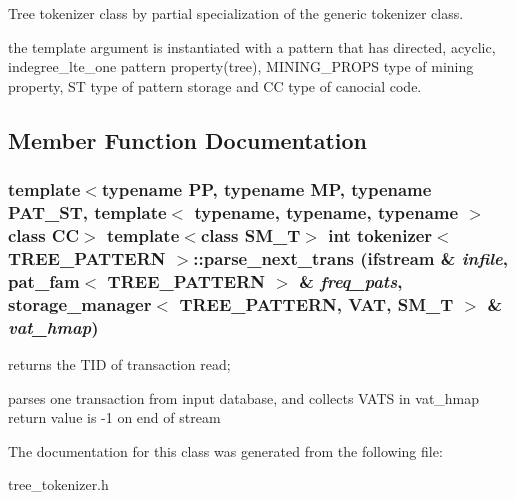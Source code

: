 Tree tokenizer class by partial specialization of the generic tokenizer class. 

the template argument is instantiated with a pattern that has directed, acyclic, indegree\_\-lte\_\-one pattern property(tree), MINING\_\-PROPS type of mining property, ST type of pattern storage and CC type of canocial code. 



\subsection{Member Function Documentation}
\subsubsection{\setlength{\rightskip}{0pt plus 5cm}template$<$typename PP, typename MP, typename PAT\_\-ST, template$<$ typename, typename, typename $>$ class CC$>$ template$<$class SM\_\-T$>$ int {\bf tokenizer}$<$ TREE\_\-PATTERN $>$::parse\_\-next\_\-trans (ifstream \& {\em infile}, {\bf pat\_\-fam}$<$ TREE\_\-PATTERN $>$ \& {\em freq\_\-pats}, {\bf storage\_\-manager}$<$ TREE\_\-PATTERN, {\bf VAT}, SM\_\-T $>$ \& {\em vat\_\-hmap})\hspace{0.3cm}{\tt  [inline]}}\label{classtokenizer_3_01TREE__PATTERN_01_4_a1}


returns the TID of transaction read;

parses one transaction from input database, and collects VATS in vat\_\-hmap return value is -1 on end of stream 

The documentation for this class was generated from the following file:\begin{CompactItemize}
\item 
tree\_\-tokenizer.h\end{CompactItemize}

